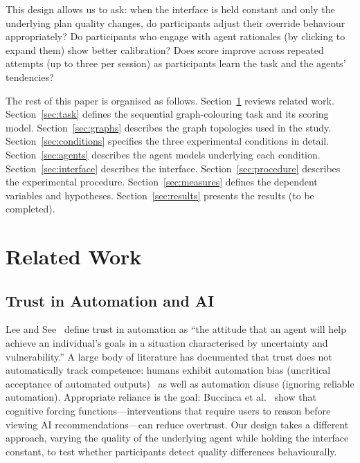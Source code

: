 \documentclass[11pt]{article}
\theoremstyle{definition}
\begin{document}
This design allows us to ask: when the interface is held constant and only the underlying
plan quality changes, do participants adjust their override behaviour appropriately?  Do
participants who engage with agent rationales (by clicking to expand them) show better
calibration?  Does score improve across repeated attempts (up to three per session) as
participants learn the task and the agents' tendencies?

The rest of this paper is organised as follows.  Section~\ref{sec:related} reviews related
work.  Section~\ref{sec:task} defines the sequential graph-colouring task and its scoring
model.  Section~\ref{sec:graphs} describes the graph topologies used in the study.
Section~\ref{sec:conditions} specifies the three experimental conditions in detail.
Section~\ref{sec:agents} describes the agent models underlying each condition.
Section~\ref{sec:interface} describes the interface.
Section~\ref{sec:procedure} describes the experimental procedure.
Section~\ref{sec:measures} defines the dependent variables and hypotheses.
Section~\ref{sec:results} presents the results (to be completed).

\section{Related Work}
\label{sec:related}

\subsection{Trust in Automation and AI}

Lee and See~\citeyearpar{lee2004trust} define trust in automation as ``the attitude that an
agent will help achieve an individual's goals in a situation characterised by uncertainty
and vulnerability.''  A large body of literature has documented that trust does not
automatically track competence: humans exhibit automation bias (uncritical acceptance of
automated outputs)~\citep{parasuraman2010complacency} as well as automation disuse
(ignoring reliable automation).  Appropriate reliance is the goal: Buccinca et al.\
\citeyearpar{buccinca2021trust} show that cognitive forcing functions---interventions that
require users to reason before viewing AI recommendations---can reduce overtrust.  Our
design takes a different approach, varying the quality of the underlying agent while
holding the interface constant, to test whether participants detect quality differences
behaviourally.
\end{document}
